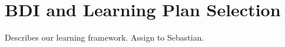 \section{BDI and Learning Plan Selection}\label{sec:framework}

Describes our learning framework. Assign to Sebastian.
